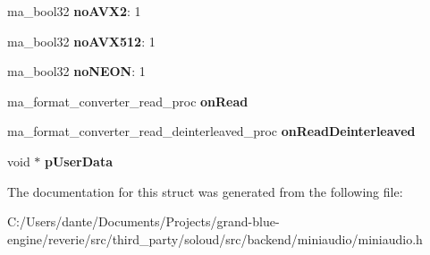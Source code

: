 \begin{DoxyCompactItemize}
ma\+\_\+bool32 {\bfseries no\+A\+V\+X2}\+: 1
\item 
\mbox{\label{structma__format__converter__config_aaf097fafbcdc81ac77e22ff395052f27}} 
ma\+\_\+bool32 {\bfseries no\+A\+V\+X512}\+: 1
\item 
\mbox{\label{structma__format__converter__config_a17e2925124e5aa799ed1b11233cdf5d6}} 
ma\+\_\+bool32 {\bfseries no\+N\+E\+ON}\+: 1
\item 
\mbox{\label{structma__format__converter__config_a101c5b9095191abb1782015e1fd33f8f}} 
ma\+\_\+format\+\_\+converter\+\_\+read\+\_\+proc {\bfseries on\+Read}
\item 
\mbox{\label{structma__format__converter__config_a68a0d4ddcc49d70b5ee9dab012a9961c}} 
ma\+\_\+format\+\_\+converter\+\_\+read\+\_\+deinterleaved\+\_\+proc {\bfseries on\+Read\+Deinterleaved}
\item 
\mbox{\label{structma__format__converter__config_af7be463232fe3d5a28c7c39389b989a4}} 
void $\ast$ {\bfseries p\+User\+Data}
\end{DoxyCompactItemize}


The documentation for this struct was generated from the following file\+:\begin{DoxyCompactItemize}
\item 
C\+:/\+Users/dante/\+Documents/\+Projects/grand-\/blue-\/engine/reverie/src/third\+\_\+party/soloud/src/backend/miniaudio/miniaudio.\+h\end{DoxyCompactItemize}
